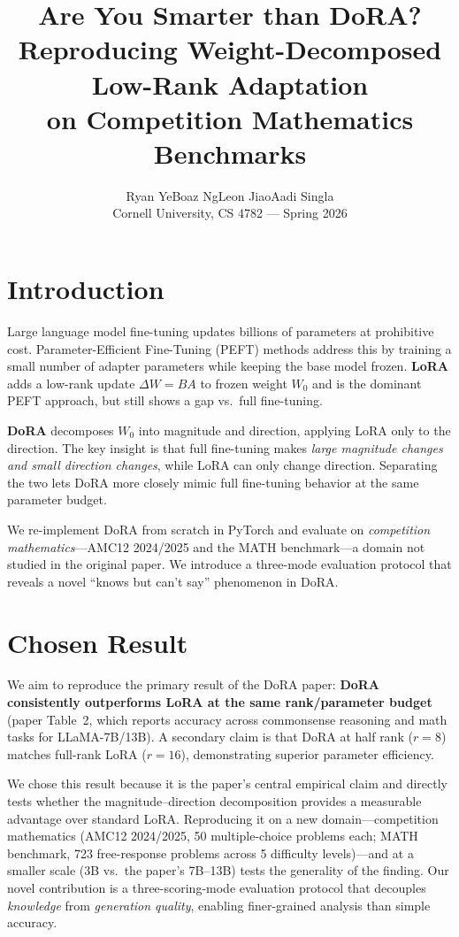 \documentclass[11pt,twocolumn]{article}
\title{\vspace{-1.2cm}%
  \large\textbf{Are You Smarter than DoRA?}\\[2pt]
  \normalsize Reproducing Weight-Decomposed Low-Rank Adaptation\\
  on Competition Mathematics Benchmarks
}
\author{
  Ryan Ye\quad Boaz Ng\quad Leon Jiao\quad Aadi Singla\\
  \small Cornell University, CS 4782 --- Spring 2026
}
\date{\vspace{-0.4cm}}
\begin{document}
\maketitle
\thispagestyle{empty}

\section{Introduction}

Large language model fine-tuning updates billions of parameters at prohibitive cost. Parameter-Efficient Fine-Tuning (PEFT) methods address this by training a small number of adapter parameters while keeping the base model frozen. \textbf{LoRA} \cite{hu2022lora} adds a low-rank update $\Delta W = BA$ to frozen weight $W_0$ and is the dominant PEFT approach, but still shows a gap vs.\ full fine-tuning.

\textbf{DoRA} \cite{liu2024dora} decomposes $W_0$ into magnitude and direction, applying LoRA only to the direction. The key insight is that full fine-tuning makes \emph{large magnitude changes and small direction changes}, while LoRA can only change direction. Separating the two lets DoRA more closely mimic full fine-tuning behavior at the same parameter budget.

We re-implement DoRA from scratch in PyTorch and evaluate on \emph{competition mathematics}---AMC12 2024/2025 and the MATH benchmark---a domain not studied in the original paper. We introduce a three-mode evaluation protocol that reveals a novel ``knows but can't say'' phenomenon in DoRA.

\section{Chosen Result}

We aim to reproduce the primary result of the DoRA paper: \textbf{DoRA consistently outperforms LoRA at the same rank/parameter budget} (paper Table~2, which reports accuracy across commonsense reasoning and math tasks for LLaMA-7B/13B). A secondary claim is that DoRA at half rank ($r{=}8$) matches full-rank LoRA ($r{=}16$), demonstrating superior parameter efficiency.

We chose this result because it is the paper's central empirical claim and directly tests whether the magnitude--direction decomposition provides a measurable advantage over standard LoRA. Reproducing it on a new domain---competition mathematics (AMC12 2024/2025, 50 multiple-choice problems each; MATH benchmark, 723 free-response problems across 5 difficulty levels)---and at a smaller scale (3B vs.\ the paper's 7B--13B) tests the generality of the finding. Our novel contribution is a three-scoring-mode evaluation protocol that decouples \emph{knowledge} from \emph{generation quality}, enabling finer-grained analysis than simple accuracy.
\end{document}
